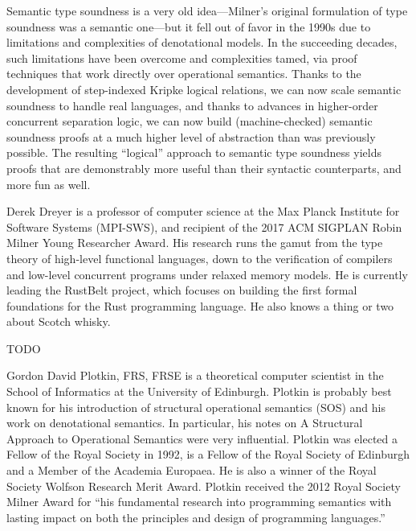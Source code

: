 Semantic type soundness is a very old idea—Milner’s original formulation of type
soundness was a semantic one—but it fell out of favor in the 1990s due to
limitations and complexities of denotational models. In the succeeding decades,
such limitations have been overcome and complexities tamed, via proof techniques
that work directly over operational semantics. Thanks to the development of
step-indexed Kripke logical relations, we can now scale semantic soundness to
handle real languages, and thanks to advances in higher-order concurrent
separation logic, we can now build (machine-checked) semantic soundness proofs
at a much higher level of abstraction than was previously possible. The
resulting ``logical'' approach to semantic type soundness yields proofs that are
demonstrably more useful than their syntactic counterparts, and more fun as
well.

\bio
Derek Dreyer is a professor of computer science at the Max Planck Institute for
Software Systems (MPI-SWS), and recipient of the 2017 ACM SIGPLAN Robin Milner
Young Researcher Award.  His research runs the gamut from the type theory of
high-level functional languages, down to the verification of compilers and
low-level concurrent programs under relaxed memory models.  He is currently
leading the RustBelt project, which focuses on building the first formal
foundations for the Rust programming language.  He also knows a thing or two
about Scotch whisky.

\medskip



\talkabstract
TODO

\bio
Gordon David Plotkin, FRS, FRSE is a theoretical
computer scientist in the School of Informatics at the University of Edinburgh.
Plotkin is probably best known for his introduction of structural operational
semantics (SOS) and his work on denotational semantics. In particular, his notes
on A Structural Approach to Operational Semantics were very influential.
Plotkin was elected a Fellow of the Royal Society in 1992, is a Fellow of the
Royal Society of Edinburgh and a Member of the Academia Europaea. He is also a
winner of the Royal Society Wolfson Research Merit Award. Plotkin received the
2012 Royal Society Milner Award for ``his fundamental research into programming
semantics with lasting impact on both the principles and design of programming
languages.''


